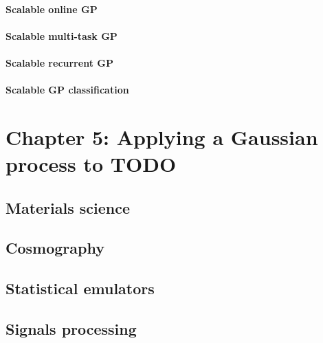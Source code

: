 \documentclass[12pt]{article}
\begin{document}
\paragraph{Scalable online GP}


\paragraph{Scalable multi-task GP}


\paragraph{Scalable recurrent GP}


\paragraph{Scalable GP classification}





\section{Chapter 5: Applying a Gaussian process to TODO}




\subsection{Materials science \cite{materials}}




\subsection{Cosmography \cite{cosmography}}




\subsection{Statistical emulators \cite{emulators}}




\subsection{Signals processing \cite{signals-processing}}









\printbibliography
\end{document}
